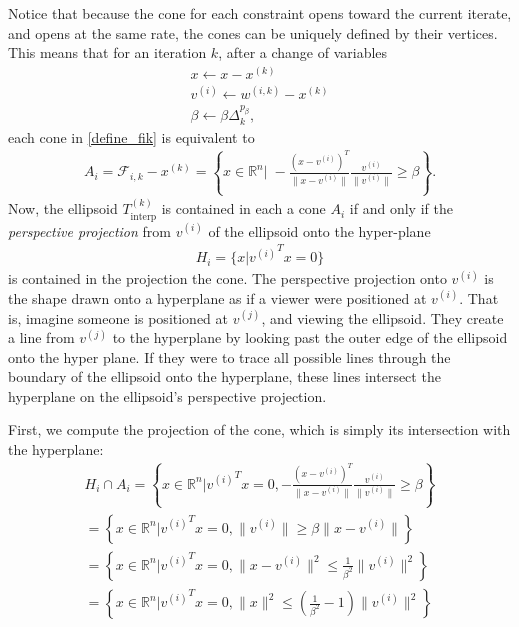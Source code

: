 \documentclass{article}
\theoremstyle{case}
\newcommand{\xk}{{x^{(k)}}}
\newcommand{\Rn}{\mathbb R^n}
\newcommand{\dk}{\Delta_k}
\newcommand{\sampletrk}{{T_{\text{interp}}^{(k)}}}
\newcommand{\fik}{{\mathcal F_{i, k}}}
\newcommand{\wik}{{w^{(i, k)}}}
\begin{document}
Notice that because the cone for each constraint opens toward the current iterate, and opens at the same rate, the cones can be uniquely defined by their vertices.
This means that for an iteration $k$, after a change of variables
\begin{align}
x \gets x - \xk \\
v^{(i)}  \gets \wik - \xk \\
\beta \gets \beta \dk^{p_{\beta}},
\end{align}
each cone in \cref{define_fik} is equivalent to
\begin{align*}
A_i = \fik - \xk = \left\{x\in\Rn\bigg|\;-\frac{(x - v^{(i)})^T}{\|x - v^{(i)}\|} \frac{v^{(i)}}{\|v^{(i)}\|} \ge \beta \right\}.
\end{align*}
Now, the ellipsoid $\sampletrk$ is contained in each a cone $A_i$ if and only if the \emph{perspective projection} from $v^{(i)}$ of the ellipsoid onto the hyper-plane 
\begin{align*}
H_i = \{x|{v^{(i)}}^Tx = 0\}
\end{align*}
is contained in the projection the cone.
The perspective projection onto $v^{(i)}$ is the shape drawn onto a hyperplane as if a viewer were positioned at $v^{(i)}$.
That is, imagine someone is positioned at $v^{(j)}$, and viewing the ellipsoid.
They create a line from $v^{(j)}$ to the hyperplane by looking past the outer edge of the ellipsoid onto the hyper plane.
If they were to trace all possible lines through the boundary of the ellipsoid onto the hyperplane, these lines intersect the hyperplane on the ellipsoid's perspective projection.

First, we compute the projection of the cone, which is simply its intersection with the hyperplane:
\begin{align*}
H_i \cap A_i 
= \left\{x \in \Rn \bigg| {v^{(i)}}^Tx = 0, -\frac{\left(x - v^{(i)}\right)^T}{\|x - v^{(i)}\|}\frac{v^{(i)}}{\|v^{(i)}\|}\ge \beta \right\} \\
= \left\{x \in \Rn \bigg| {v^{(i)}}^Tx = 0, \|v^{(i)}\|\ge \beta\|x - v^{(i)}\| \right\} \\
= \left\{x \in \Rn \bigg| {v^{(i)}}^Tx = 0, \|x - v^{(i)}\|^2 \le \frac 1 {\beta^2}\|v^{(i)}\|^2 \right\} \\
= \left\{x \in \Rn \bigg| {v^{(i)}}^Tx = 0, \|x\|^2 \le \left(\frac 1 {\beta^2} - 1\right)\|v^{(i)}\|^2 \right\} \\
\end{align*}
\end{document}
